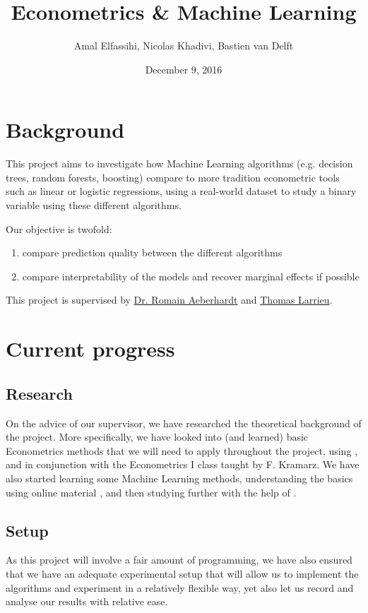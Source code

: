 \documentclass[a4paper]{article}
\begin{document}
\title{Econometrics \& Machine Learning}
\author{Amal Elfassihi, Nicolas Khadivi, Bastien van Delft}
\date{December 9, 2016}
\maketitle

\section{Background}

This project aims to investigate how Machine Learning algorithms (e.g. decision trees, random
forests, boosting) compare to more tradition econometric tools such as linear or logistic
regressions, using a real-world dataset \cite{enquete} to study a binary variable using these
different algorithms.

Our objective is twofold:
\begin{enumerate}[nosep]
    \item compare prediction quality between the different algorithms
    \item compare interpretability of the models and recover marginal effects if possible
\end{enumerate}

This project is supervised by \href{http://www.crest.fr/pagesperso.php?user=3045}{Dr. Romain Aeberhardt} and \href{http://thomas-larrieu.strikingly.com/}{Thomas Larrieu}.

\section{Current progress}
\subsection{Research}
On the advice of our supervisor, we have researched the theoretical background of the project. More specifically, we have looked into (and learned) basic Econometrics methods that we will need to apply throughout the project, using \cite{wooldridge}, and in conjunction with the Econometrics I class taught by F. Kramarz. We have also started learning some Machine Learning methods, understanding the basics using online material \cite{vidhya}, and then studying further with the help of \cite{introR}.

\subsection{Setup}
As this project will involve a fair amount of programming, we have also ensured that we have an adequate experimental setup that will allow us to implement the algorithms and experiment in a relatively flexible way, yet also let us record and analyse our results with relative ease.
\end{document}
